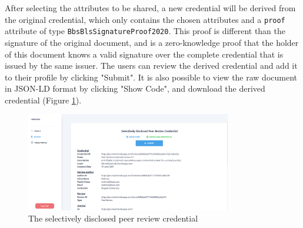 After selecting the attributes to be shared, a new credential will be derived from the original credential, which only contains the chosen attributes and a \lstinline{proof} attribute of type \lstinline{BbsBlsSignatureProof2020}. This proof is different than the signature of the original document, and is a zero-knowledge proof that the holder of this document knows a valid signature over the complete credential that is issued by the same issuer. The users can review the derived credential and add it to their profile by clicking "Submit". It is also possible to view the raw document in \acrshort{JSON-LD} format by clicking "Show Code", and download the derived credential (Figure \ref{fig:derived-credential}).


\begin{figure}[htpb]
  \centering
  \includegraphics[width=0.8\textwidth]{figures/derived-credential.png}
  \caption{The selectively disclosed peer review credential} \label{fig:derived-credential}
\end{figure}

